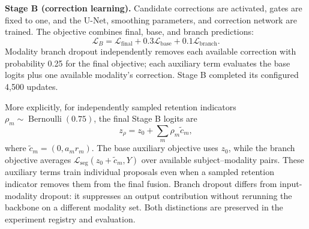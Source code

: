 \documentclass[conference]{IEEEtran}
\begin{document}
\textbf{Stage B (correction learning).} Candidate corrections are activated, gates are fixed to one, and the U-Net, smoothing parameters, and correction network are trained. The objective combines final, base, and branch predictions:
\begin{equation}
\mathcal L_B=\mathcal L_{\mathrm{final}}
+0.3\mathcal L_{\mathrm{base}}+0.1\mathcal L_{\mathrm{branch}}.
\label{eq:stageb}
\end{equation}
Modality branch dropout independently removes each available correction with probability 0.25 for the final objective; each auxiliary term evaluates the base logits plus one available modality's correction. Stage B completed its configured 4,500 updates.

More explicitly, for independently sampled retention indicators $\rho_m\sim\operatorname{Bernoulli}(0.75)$, the final Stage B logits are
\begin{equation}
z_{\rho}=z_0+\sum_m\rho_m\tilde c_m,
\label{eq:dropout}
\end{equation}
where $\tilde c_m=(0,a_mr_m)$. The base auxiliary objective uses $z_0$, while the branch objective averages $\mathcal L_{\mathrm{seg}}(z_0+\tilde c_m,Y)$ over available subject--modality pairs. These auxiliary terms train individual proposals even when a sampled retention indicator removes them from the final fusion. Branch dropout differs from input-modality dropout: it suppresses an output contribution without rerunning the backbone on a different modality set. Both distinctions are preserved in the experiment registry and evaluation.
\end{document}
